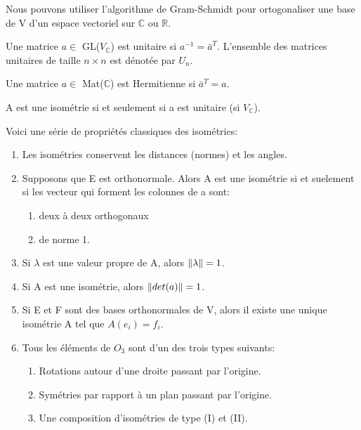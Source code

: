 \documentclass[../notesdecours.tex]{subfiles}
\begin{document}
Nous pouvons utiliser l'algorithme de Gram-Schmidt pour ortogonaliser une base de V d'un espace vectoriel sur $\mathbb{C}$ ou $\mathbb{R}$.\\

\begin{definition} Une matrice $a \in$ GL($V_{\mathbb{C}}$) est unitaire si $a^{-1} = \bar{a}^T$. L'ensemble des matrices unitaires de taille $n \times n$ est dénotée par $U_n$. \label{Unitaire}\end{definition}

\begin{definition} Une matrice $a \in$ Mat($\mathbb{C}$) est Hermitienne si $\bar{a}^T = a$. \label{Hermitienne}\end{definition}

\begin{Property} A est une isométrie si et seulement si a est unitaire (si $V_\mathbb{C}$). \end{Property}

Voici une série de propriétés classiques des isométries:
\begin{enumerate}
\item Les isométries conservent les distances (normes) et les angles.
\item Supposons que E est orthonormale. Alors A est une isométrie si et suelement si les vecteur qui forment les colonnes de a sont:
	\begin{enumerate}
	\item deux à deux orthogonaux
	\item de norme 1.
	\end{enumerate}
\item Si $\lambda$ est une valeur propre de A, alors $\norm{\lambda} = 1$.
\item Si A est une isométrie, alors $\norm{det(a)} = 1$.
\item Si E et F sont des bases orthonormales de V, alors il existe une unique isométrie A tel que $A(e_i) = f_i$.
\item Tous les éléments de $O_3$ sont d'un des trois types suivants:
	\begin{enumerate}
	\item Rotations autour d'une droite passant par l'origine.
	\item Symétries par rapport à un plan passant par l'origine.
	\item Une composition d'isométries de type (I) et (II).
	\end{enumerate}
\end{enumerate}
\end{document}
